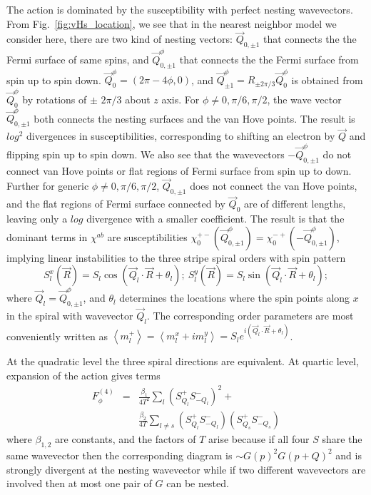 \documentclass[%
reprint,
superscriptaddress,
twocolumn,
 amsmath,amssymb,
 aps,
 prb,
]{revtex4-2}
\begin{document}
The action is dominated by the susceptibility with perfect nesting wavevectors. From Fig.~\ref{fig:vHs_location}, we see that in the nearest neighbor model we consider here, there are two kind of nesting vectors: $\vec{Q}_{0,\pm 1}$ that connects the the Fermi surface of same spins, and $\vec{Q}_{0,\pm 1}^{\phi}$ that connects the the Fermi surface from spin up to spin down. $\vec{Q}_0^{\phi}=(2\pi-4\phi,0)$, and $\vec{Q}_{\pm 1}^{\phi}=R_{\pm2\pi/3}\vec{Q}_0^{\phi}$ is obtained from $\vec{Q}_0^{\phi}$ by rotations of $\pm$ $2\pi/3$ about $z$ axis.  For $\phi\neq 0,\pi/6,\pi/2$, the wave vector $\vec{Q}_{0,\pm1}^{\phi}$ both connects the nesting surfaces and the van Hove points. The result is $log^2$ divergences in susceptibilities, corresponding to shifting an electron by $\vec{Q}$ and flipping spin up to spin down. We also see that the wavevectors $-\vec{Q}_{0,\pm1}^{\phi}$ do not connect van Hove points or flat regions of Fermi surface from spin up to down. Further for generic $\phi\neq0,\pi/6,\pi/2$, $\vec{Q}_{0,\pm 1}$ does not connect the van Hove points, and the flat regions of Fermi surface connected by $\vec{Q}_0$ are of different lengths, leaving only a $log$ divergence with a smaller coefficient. The result is that the dominant terms in $\chi^{ab}$ are susceptibilities  $\chi^{+-}_0(\vec{Q}^\phi_{0,\pm1})=\chi_0^{-+}(-\vec{Q}^\phi_{0,\pm1})$, 
implying linear instabilities to the three stripe spiral orders  with  spin pattern
\begin{equation}
    S^x_l(\vec{R})=S_l\cos\left(\vec{Q}_l\cdot\vec{R}+\theta_l\right);~S^y_l(\vec{R})=S_l\sin\left(\vec{Q}_l\cdot\vec{R}+\theta_l\right);
\end{equation}
where  $\vec{Q}_l=\vec{Q}^\phi_{0,\pm1}$, and $\theta_l$ determines the locations where the spin points along $x$ in the spiral with wavevector $\vec{Q}_l$. The corresponding order parameters are most conveniently written as $\left<m_l^+\right>=\left<m_l^x+im_l^y\right>=S_le^{i(\vec{Q}_l\cdot\vec{R}+\theta_l)}$.

At the quadratic level the three spiral directions are equivalent. At quartic level, expansion of the action gives terms 
\begin{eqnarray}
    F^{(4)}_\phi&=&\frac{\beta_1} {4T^2}\sum_l\left(S^+_{Q_l}S^-_{-Q_l}\right)^2+\nonumber \\
    &&\frac{\beta_2 }{4T}\sum_{l\neq s}\left(S^+_{Q_l}S^-_{-Q_l}\right)\left(S^+_{Q_s}S^-_{-Q_s}\right)
    \label{eq:S4}
\end{eqnarray}
where $\beta_{1,2}$ are constants, and the factors of $T$ arise because if all four $S$ share the same wavevector then the corresponding diagram is $\sim G(p)^2G(p+Q)^2$ and is strongly divergent at the nesting wavevector while if two different wavevectors are involved then at most one pair of $G$ can be nested.
\end{document}
